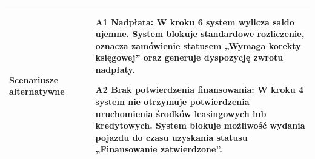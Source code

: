 \begin{longtable}{|p{4cm}|p{11cm}|}
Scenariusze alternatywne &
\begin{itemize}
\item [A1] Nadpłata: W kroku 6 system wylicza saldo ujemne. System blokuje standardowe rozliczenie, oznacza zamówienie statusem „Wymaga korekty księgowej” oraz generuje dyspozycję zwrotu nadpłaty.
\item [A2] Brak potwierdzenia finansowania: W kroku 4 system nie otrzymuje potwierdzenia uruchomienia środków leasingowych lub kredytowych. System blokuje możliwość wydania pojazdu do czasu uzyskania statusu „Finansowanie zatwierdzone”.
\end{itemize}
\\
\hline

\end{longtable}
